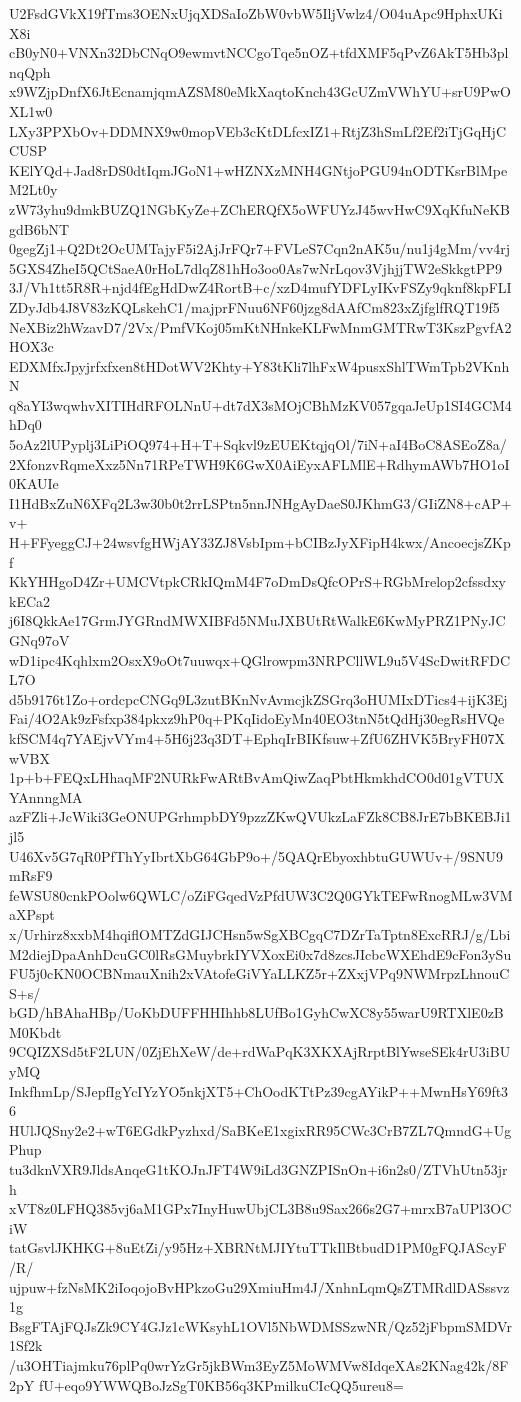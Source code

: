 U2FsdGVkX19fTms3OENxUjqXDSaIoZbW0vbW5IljVwlz4/O04uApc9HphxUKiX8i
cB0yN0+VNXn32DbCNqO9ewmvtNCCgoTqe5nOZ+tfdXMF5qPvZ6AkT5Hb3plnqQph
x9WZjpDnfX6JtEcnamjqmAZSM80eMkXaqtoKnch43GcUZmVWhYU+srU9PwOXL1w0
LXy3PPXbOv+DDMNX9w0mopVEb3cKtDLfcxIZ1+RtjZ3hSmLf2Ef2iTjGqHjCCUSP
KElYQd+Jad8rDS0dtIqmJGoN1+wHZNXzMNH4GNtjoPGU94nODTKsrBlMpeM2Lt0y
zW73yhu9dmkBUZQ1NGbKyZe+ZChERQfX5oWFUYzJ45wvHwC9XqKfuNeKBgdB6bNT
0gegZj1+Q2Dt2OcUMTajyF5i2AjJrFQr7+FVLeS7Cqn2nAK5u/nu1j4gMm/vv4rj
5GXS4ZheI5QCtSaeA0rHoL7dlqZ81hHo3oo0As7wNrLqov3VjhjjTW2eSkkgtPP9
3J/Vh1tt5R8R+njd4fEgHdDwZ4RortB+c/xzD4mufYDFLyIKvFSZy9qknf8kpFLI
ZDyJdb4J8V83zKQLskehC1/majprFNuu6NF60jzg8dAAfCm823xZjfglfRQT19f5
NeXBiz2hWzavD7/2Vx/PmfVKoj05mKtNHnkeKLFwMnmGMTRwT3KszPgvfA2HOX3c
EDXMfxJpyjrfxfxen8tHDotWV2Khty+Y83tKli7lhFxW4pusxShlTWmTpb2VKnhN
q8aYI3wqwhvXITIHdRFOLNnU+dt7dX3sMOjCBhMzKV057gqaJeUp1SI4GCM4hDq0
5oAz2lUPyplj3LiPiOQ974+H+T+Sqkvl9zEUEKtqjqOl/7iN+aI4BoC8ASEoZ8a/
2XfonzvRqmeXxz5Nn71RPeTWH9K6GwX0AiEyxAFLMlE+RdhymAWb7HO1oI0KAUIe
I1HdBxZuN6XFq2L3w30b0t2rrLSPtn5nnJNHgAyDaeS0JKhmG3/GIiZN8+cAP+v+
H+FFyeggCJ+24wsvfgHWjAY33ZJ8VsbIpm+bCIBzJyXFipH4kwx/AncoecjsZKpf
KkYHHgoD4Zr+UMCVtpkCRkIQmM4F7oDmDsQfcOPrS+RGbMrelop2cfssdxykECa2
j6I8QkkAe17GrmJYGRndMWXIBFd5NMuJXBUtRtWalkE6KwMyPRZ1PNyJCGNq97oV
wD1ipc4Kqhlxm2OsxX9oOt7uuwqx+QGlrowpm3NRPCllWL9u5V4ScDwitRFDCL7O
d5b9176t1Zo+ordcpcCNGq9L3zutBKnNvAvmcjkZSGrq3oHUMIxDTics4+ijK3Ej
Fai/4O2Ak9zFsfxp384pkxz9hP0q+PKqIidoEyMn40EO3tnN5tQdHj30egRsHVQe
kfSCM4q7YAEjvVYm4+5H6j23q3DT+EphqIrBIKfsuw+ZfU6ZHVK5BryFH07XwVBX
1p+b+FEQxLHhaqMF2NURkFwARtBvAmQiwZaqPbtHkmkhdCO0d01gVTUXYAnnngMA
azFZli+JcWiki3GeONUPGrhmpbDY9pzzZKwQVUkzLaFZk8CB8JrE7bBKEBJi1jl5
U46Xv5G7qR0PfThYyIbrtXbG64GbP9o+/5QAQrEbyoxhbtuGUWUv+/9SNU9mRsF9
feWSU80cnkPOolw6QWLC/oZiFGqedVzPfdUW3C2Q0GYkTEFwRnogMLw3VMaXPspt
x/Urhirz8xxbM4hqiflOMTZdGIJCHsn5wSgXBCgqC7DZrTaTptn8ExcRRJ/g/Lbi
M2diejDpaAnhDcuGC0lRsGMuybrkIYVXoxEi0x7d8zcsJIcbcWXEhdE9cFon3ySu
FU5j0cKN0OCBNmauXnih2xVAtofeGiVYaLLKZ5r+ZXxjVPq9NWMrpzLhnouCS+s/
bGD/hBAhaHBp/UoKbDUFFHHIhhb8LUfBo1GyhCwXC8y55warU9RTXlE0zBM0Kbdt
9CQIZXSd5tF2LUN/0ZjEhXeW/de+rdWaPqK3XKXAjRrptBlYwseSEk4rU3iBUyMQ
InkfhmLp/SJepfIgYcIYzYO5nkjXT5+ChOodKTtPz39cgAYikP++MwnHsY69ft36
HUlJQSny2e2+wT6EGdkPyzhxd/SaBKeE1xgixRR95CWc3CrB7ZL7QmndG+UgPhup
tu3dknVXR9JldsAnqeG1tKOJnJFT4W9iLd3GNZPISnOn+i6n2s0/ZTVhUtn53jrh
xVT8z0LFHQ385vj6aM1GPx7InyHuwUbjCL3B8u9Sax266s2G7+mrxB7aUPl3OCiW
tatGsvlJKHKG+8uEtZi/y95Hz+XBRNtMJIYtuTTkIlBtbudD1PM0gFQJAScyF/R/
ujpuw+fzNsMK2iIoqojoBvHPkzoGu29XmiuHm4J/XnhnLqmQsZTMRdlDASssvz1g
BsgFTAjFQJsZk9CY4GJz1cWKsyhL1OVl5NbWDMSSzwNR/Qz52jFbpmSMDVr1Sf2k
/u3OHTiajmku76plPq0wrYzGr5jkBWm3EyZ5MoWMVw8IdqeXAs2KNag42k/8F2pY
fU+eqo9YWWQBoJzSgT0KB56q3KPmilkuCIcQQ5ureu8=
